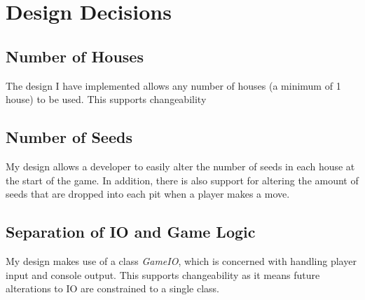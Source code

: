 \documentclass[10pt, a4paper, conference]{IEEEtran}
\begin{document}
\section{Design Decisions}

\subsection{Number of Houses}
The design I have implemented allows any number of houses (a minimum of
1 house) to be used. This supports changeability

\subsection{Number of Seeds}
My design allows a developer to easily alter the number of seeds in each house
at the start of the game. In addition, there is also support for altering the amount of seeds that are dropped into each pit when a player makes a move.

\subsection{Separation of IO and Game Logic}
My design makes use of a class \textit{GameIO}, which 
is concerned with handling player input and console output.
This supports changeability as it means future alterations to IO are
constrained to a single class. 

\end{document}
